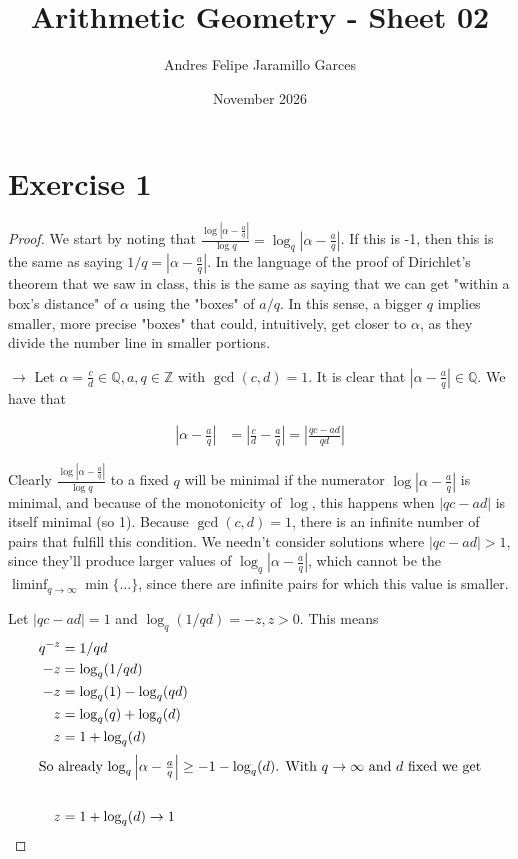 \documentclass{article}
\title{Arithmetic Geometry - Sheet 02}
\author{Andres Felipe Jaramillo Garces}
\date{November 2026}
\newcommand{\Q}{\mathbb{Q}}
\newcommand{\Z}{\mathbb{Z}}
\newcommand{\abs}[1]{\left| #1 \right|}
\begin{document}
\maketitle
\section*{Exercise 1}
\begin{proof}

We start by noting that $\frac{\log\abs{\alpha - \frac{a}{q}}}{\log q} = \log_q\abs{\alpha - \frac{a}{q}}$. If this is -1, then this is the same as saying $1/q = \abs{\alpha - \frac{a}{q}}$. In the language of the proof of Dirichlet's theorem that we saw in class, this is the same as saying that we can get "within a box's distance" of $\alpha$ using the "boxes" of $a/q$. In this sense, a bigger $q$ implies smaller, more precise "boxes" that could, intuitively, get closer to $\alpha$, as they divide the number line in smaller portions.

$\rightarrow$ Let $\alpha = \frac{c}{d} \in \Q, a, q \in \Z$ with $\gcd(c,d) = 1$.
It is clear that $\abs{\alpha - \frac{a}{q}} \in \Q$. We have that

\begin{align*}
  \abs{\alpha - \frac{a}{q}} &= 
  \abs{\frac{c}{d} - \frac{a}{q}} = \abs{\frac{qc - ad}{qd}}
\end{align*}

Clearly $\frac{\log\abs{\alpha - \frac{a}{q}}}{\log q}$ to a fixed $q$ will be minimal if the numerator $\log\abs{\alpha - \frac{a}{q}}$ is minimal, and because of the monotonicity of $\log$, this happens when $\abs{qc - ad}$ is itself minimal (so 1). Because $\gcd(c,d) = 1$, there is an infinite number of pairs that fulfill this condition. We needn't consider solutions where $\abs{qc - ad} > 1$, since they'll produce larger values of $\log_q\abs{\alpha - \frac{a}{q}}$, which cannot be the $\liminf_{q\to\infty}\min\{ \dots \}$, since there are infinite pairs for which this value is smaller.

Let $\abs{qc - ad} = 1$ and $\log_q(1/qd) = -z, z > 0$. This means 
\begin{align*}
  q^{-z} &= 1/qd \\
  -z &= \log_q(1/qd) \\
  -z &= \log_q(1) - \log_q(qd) \\
  z &= \log_q(q) + \log_q(d) \\
  z &= 1 + \log_q(d)\\
  \intertext{So already $\log_q\abs{\alpha - \frac{a}{q}} \geq - 1 - \log_q(d)$. With $q \to \infty$ and $d$ fixed we get} \\
  z &= 1 + \log_q(d) \rightarrow 1
\end{align*}


\end{proof}
\end{document}
